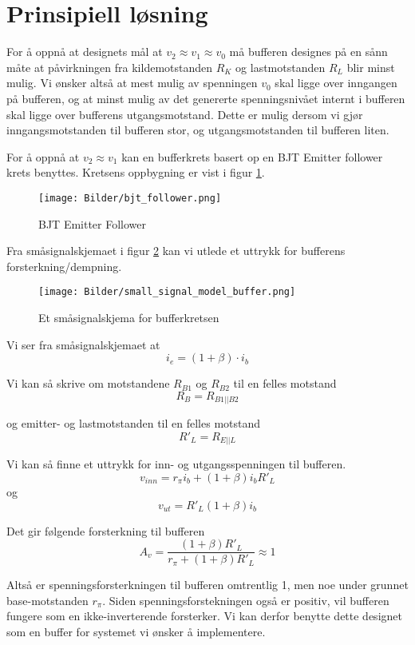 \section{Prinsipiell løsning}
\label{prinsipiellLoesning}

For å oppnå at designets mål at $v_2 \approx v_1 \approx v_0$ må bufferen designes på en sånn måte
at påvirkningen fra kildemotstanden $R_K$ og lastmotstanden $R_L$ blir minst mulig. Vi ønsker altså at mest 
mulig av spenningen $v_0$ skal ligge over inngangen på bufferen, og at minst mulig av det genererte 
spenningsnivået internt i bufferen skal ligge over bufferens utgangsmotstand. Dette er mulig dersom 
vi gjør inngangsmotstanden til bufferen stor, og utgangsmotstanden til bufferen liten.

For å oppnå at $v_2 \approx v_1$ kan en bufferkrets basert op en BJT Emitter follower krets benyttes. 
Kretsens oppbygning er vist i figur \ref{fig:bjt_voltage_follower}.

\begin{figure}[H]
    \centering 
    \texttt{[image: Bilder/bjt\_follower.png]}
    \caption{BJT Emitter Follower}
    \label{fig:bjt_voltage_follower}
\end{figure}

Fra småsignalskjemaet i figur \ref{fig:small_signal} kan vi utlede et uttrykk for bufferens forsterkning/dempning.

\begin{figure}[H]
    \centering
    \texttt{[image: Bilder/small\_signal\_model\_buffer.png]}
    \caption{Et småsignalskjema for bufferkretsen \cite{hambley}}
    \label{fig:small_signal}
\end{figure}

Vi ser fra småsignalskjemaet at 
\[
    i_e = (1 + \beta) \cdot i_b
\]

Vi kan så skrive om motstandene $R_{B1}$ og $R_{B2}$ til en felles motstand 
\[
    R_B = R_{B1 || B2}
\]

og emitter- og lastmotstanden til en felles motstand
\[
    R'_L = R_{E || L}
\]

Vi kan så finne et uttrykk for inn- og utgangsspenningen til bufferen.
\[
    v_{inn} = r_{\pi} i_b + (1 + \beta)i_b R'_L
\]
og
\[
    v_{ut} = R'_L (1 + \beta)i_b
\]

Det gir følgende forsterkning til bufferen
\[
    A_v = \frac{(1 + \beta)R'_L}{r_{\pi} + (1 + \beta)R'_L} \approx 1
\]

Altså er spenningsforsterkningen til bufferen omtrentlig 1, men noe under grunnet 
base-motstanden $r_{\pi}$. Siden spenningsforstekningen også er positiv, vil bufferen fungere 
som en ikke-inverterende forsterker. Vi kan derfor benytte dette designet som en buffer for systemet 
vi ønsker å implementere.

